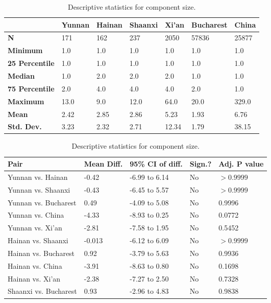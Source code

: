 \begin{table}[h]
	\begin{mdframed}
		\begin{tabular*}{\linewidth}{l|llllll}
			\hline
			\textbf{ } & \textbf{Yunnan} & \textbf{Hainan} & \textbf{Shaanxi} & \textbf{Xi'an} & \textbf{Bucharest} & \textbf{China}\\
			\hline
			\textbf{N} & 171 & 162 & 237 & 2050 & 57836 & 25877\\
			\textbf{Minimum} & 1.0 & 1.0 & 1.0 & 1.0 & 1.0 & 1.0\\
			\textbf{25 Percentile} & 1.0 & 1.0 & 1.0 & 1.0 & 1.0 & 1.0\\
			\textbf{Median} & 1.0 & 2.0 & 2.0 & 2.0 & 1.0 & 1.0\\
			\textbf{75 Percentile} & 2.0 & 4.0 & 4.0 & 4.0 & 2.0 & 1.0\\
			\textbf{Maximum} & 13.0 & 9.0 & 12.0 & 64.0 & 20.0 & 329.0\\
			\textbf{Mean} & 2.42 & 2.85 & 2.86 & 5.23 & 1.93 & 6.76\\
			\textbf{Std. Dev.} & 3.23 & 2.32 & 2.71 & 12.34 & 1.79 & 38.15\\
			\hline
		\end{tabular*}
		\caption{Descriptive statistics for component size.}
		\label{tab:component_size_desc}
		\vskip 10pt
		\small
		\begin{tabular*}{\linewidth}{l|llll}
			\hline
			\textbf{Pair} & \textbf{Mean Diff.} & \textbf{95\% CI of diff.} & \textbf{Sign.?} & \textbf{Adj. P value}\\
			\hline
			Yunnan vs. Hainan & -0.42 & -6.99 to 6.14 & No & $>0.9999$\\
			Yunnan vs. Shaanxi & -0.43 & -6.45 to 5.57 & No & $>0.9999$\\
			Yunnan vs. Bucharest & 0.49 & -4.09 to 5.08 & No & 0.9996\\
			Yunnan vs. China & -4.33 & -8.93 to 0.25 & No & 0.0772\\
			Yunnan vs. Xi'an & -2.81 & -7.58 to 1.95 & No & 0.5452\\
			Hainan vs. Shaanxi & -0.013 & -6.12 to 6.09 & No & $>0.9999$\\
			Hainan vs. Bucharest & 0.92 & -3.79 to 5.63 & No & 0.9936\\
			Hainan vs. China & -3.91 & -8.63 to 0.80 & No & 0.1698\\
			Hainan vs. Xi'an & -2.38 & -7.27 to 2.50 & No & 0.7328\\
			Shaanxi vs. Bucharest & 0.93 & -2.96 to 4.83 & No & 0.9838\\

\end{tabular*}
\end{mdframed}
\end{table}
